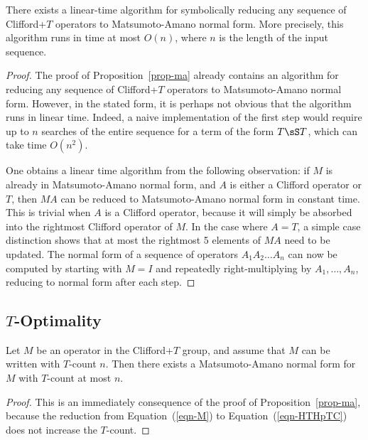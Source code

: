 \begin{corollary}\label{cor-efficient}
  There exists a linear-time algorithm for symbolically reducing any sequence of Clifford+$T$
  operators to Matsumoto-Amano normal form. More precisely, this algorithm runs in time at most
  $O(n)$, where $n$ is the length of the input sequence.
\end{corollary}

\begin{proof}
  The proof of Proposition~\vref{prop-ma} already contains an algorithm for reducing any sequence of
  Clifford+$T$ operators to Matsumoto-Amano normal form. However, in the stated form, it is perhaps
  not obvious that the algorithm runs in linear time. Indeed, a naive implementation of the first
  step would require up to $n$ searches of the entire sequence for a term of the form $T\sS T$,
  which can take time $O(n^2)$.

  One obtains a linear time algorithm from the following observation: if $M$ is already in
  Matsumoto-Amano normal form, and $A$ is either a Clifford operator or $T$, then $MA$ can be
  reduced to Matsumoto-Amano normal form in constant time. This is trivial when $A$ is a Clifford
  operator, because it will simply be absorbed into the rightmost Clifford operator of $M$. In the
  case where $A=T$, a simple case distinction shows that at most the rightmost 5 elements of $MA$
  need to be updated. The normal form of a sequence of operators $A_1A_2\ldots A_n$ can now be
  computed by starting with $M=I$ and repeatedly right-multiplying by $A_1,\ldots,A_n$, reducing to
  normal form after each step.
\end{proof}


\subsection{$T$-Optimality} %
\label{sub:_t_optimality}
\begin{corollary}
  Let $M$ be an operator in the Clifford+$T$ group, and assume that $M$ can be written with
  $T$-count $n$. Then there exists a Matsumoto-Amano normal form for $M$ with $T$-count at most $n$.
\end{corollary}

\begin{proof}
  This is an immediately consequence of the proof of Proposition~\ref{prop-ma}, because the
  reduction from Equation~(\ref{eqn-M}) to Equation~(\ref{eqn-HTHpTC}) does not increase the
  $T$-count.
\end{proof}

